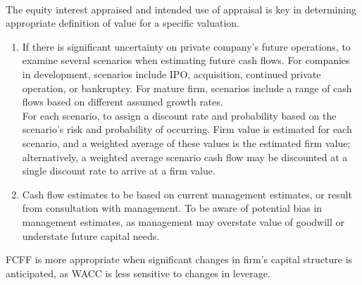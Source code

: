 \begin{remark} \\
The equity interest appraised and intended use of appraisal is key in determining appropriate definition of value for a specific valuation.
\begin{enumerate}[label=\roman*.]
\setlength{\itemsep}{0pt}
\item If there is significant uncertainty on private company's future operations, to examine several scenarios when estimating future cash flows. For companies in development, scenarios include IPO, acquisition, continued private operation, or bankruptcy. For mature firm, scenarios include a range of cash flows based on different assumed growth rates.\\
For each scenario, to assign a discount rate and probability based on the scenario's risk and probability of occurring. Firm value is estimated for each scenario, and a weighted average of these values is the estimated firm value; alternatively, a weighted average scenario cash flow may be discounted at a single discount rate to arrive at a firm value.
\item Cash flow estimates to be based on current management estimates, or result from consultation with management. To be aware of potential bias in management estimates, as management may overstate value of goodwill or understate future capital needs.
\end{enumerate}
FCFF is more appropriate when significant changes in firm's capital structure is anticipated, as WACC is less sensitive to changes in leverage.
\end{remark}

